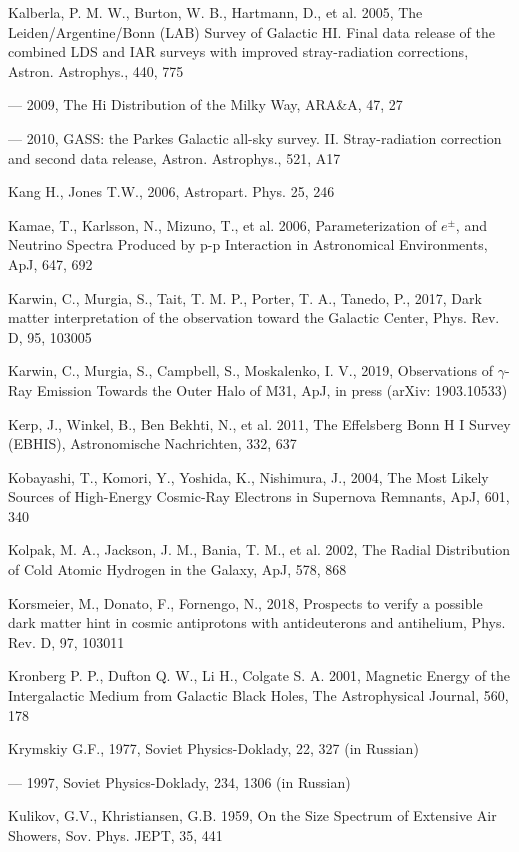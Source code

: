 Kalberla, P. M. W., Burton, W. B., Hartmann, D., et al. 2005, The Leiden/Argentine/Bonn (LAB) Survey of Galactic HI. Final data release of the combined LDS and IAR surveys with improved stray-radiation corrections, Astron. Astrophys., 440, 775

--- 2009, The Hi Distribution of the Milky Way, ARA\&A, 47, 27

--- 2010, GASS: the Parkes Galactic all-sky survey. II. Stray-radiation correction and second data release, Astron. Astrophys., 521, A17

Kang H., Jones T.W., 2006, Astropart. Phys. 25, 246

Kamae, T., Karlsson, N., Mizuno, T., et al. 2006, Parameterization of $e^\pm$, and Neutrino Spectra Produced by p-p Interaction in Astronomical Environments, ApJ, 647, 692

Karwin, C., Murgia, S., Tait, T. M. P., Porter, T. A., Tanedo, P., 2017, Dark matter interpretation of the \fermilat{} observation toward the Galactic Center, Phys. Rev. D, 95, 103005

Karwin, C., Murgia, S., Campbell, S., Moskalenko, I. V., 2019, \fermilat{} Observations of $\gamma$-Ray Emission Towards the Outer Halo of M31, ApJ, in press (arXiv: 1903.10533) 

Kerp, J., Winkel, B., Ben Bekhti, N., et al. 2011, The Effelsberg Bonn H I Survey (EBHIS), Astronomische Nachrichten, 332, 637

Kobayashi, T., Komori, Y., Yoshida, K., Nishimura, J., 2004, The Most Likely Sources of High-Energy Cosmic-Ray Electrons in Supernova Remnants, ApJ, 601, 340

Kolpak, M. A., Jackson, J. M., Bania, T. M., et al. 2002, The Radial Distribution of Cold Atomic Hydrogen in the Galaxy, ApJ, 578, 868

Korsmeier, M., Donato, F., Fornengo, N., 2018, Prospects to verify a possible dark matter hint in cosmic antiprotons with antideuterons and antihelium, Phys. Rev. D, 97, 103011

Kronberg P. P., Dufton Q. W., Li H., Colgate S. A. 2001, Magnetic Energy of the Intergalactic Medium from Galactic Black Holes, The Astrophysical Journal, 560, 178

Krymskiy G.F., 1977, Soviet Physics-Doklady, 22, 327 (in Russian)

--- 1997, Soviet Physics-Doklady, 234, 1306 (in Russian)

Kulikov, G.V., Khristiansen, G.B. 1959, On the Size Spectrum of Extensive Air Showers, Sov. Phys. JEPT, 35, 441

